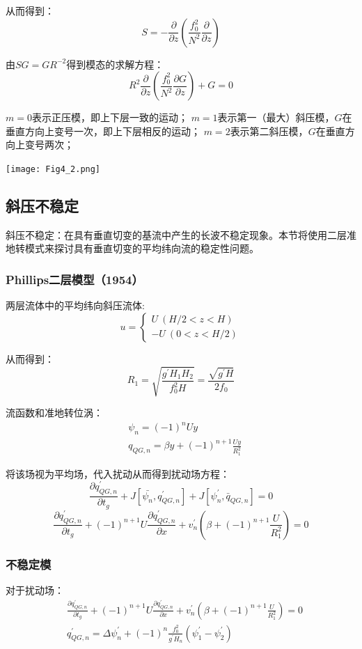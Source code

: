 \documentclass{article}
\begin{document}
从而得到：
$$S = -\frac{\partial}{\partial z}\left(\frac{f_0^2}{N^2}\frac{\partial}{\partial z}\right)$$

由$SG=GR^{-2}$得到模态的求解方程：
$$  R^2\frac{\partial}{\partial z}\left(\frac{f_0^2}{N^2}\frac{\partial G}{\partial z}\right) + G=0$$

$m=0$表示正压模，即上下层一致的运动；
$m=1$表示第一（最大）斜压模，$G$在垂直方向上变号一次，即上下层相反的运动；
$m=2$表示第二斜压模，$G$在垂直方向上变号两次；
\begin{center}
    \texttt{[image: Fig4\_2.png]}
\end{center}


\subsection{斜压不稳定}
斜压不稳定：在具有垂直切变的基流中产生的长波不稳定现象。本节将使用二层准地转模式来探讨具有垂直切变的平均纬向流的稳定性问题。

\subsubsection{Phillips二层模型（1954）}
两层流体中的平均纬向斜压流体:
$$u=\begin{cases}
    U \ (H/2<z<H) \\
    -U \ (0 < z < H/2)
\end{cases}$$

从而得到：
$$R_1 = \sqrt{\frac{g^{\prime}H_1H_2}{f_0^2H}} = \frac{\sqrt{g^{\prime}H}}{2f_0}$$

流函数和准地转位涡：
\begin{align}
&\psi_n = (-1)^nUy\\
&q_{QG,n} = \beta y + (-1)^{n+1}\frac{Uy}{R_1^2}   
\end{align}

将该场视为平均场，代入扰动从而得到扰动场方程：
$$\frac{\partial q^{\prime}_{QG,n}}{\partial t_g} + J[\bar{\psi_n}, q^{\prime}_{QG,n}] + J[\psi^{\prime}_n, \bar{q}_{QG,n}]= 0$$
$$\frac{\partial q^{\prime}_{QG,n}}{\partial t_g} + (-1)^{n+1}U\frac{\partial q^{\prime}_{QG,n}}{\partial x} + v^{\prime}_n\left(\beta + (-1)^{n+1}\frac{U}{R_1^2}\right)= 0$$

\subsubsection{不稳定模}
对于扰动场：
\begin{align}
    &\frac{\partial q^{\prime}_{QG,n}}{\partial t_g} + (-1)^{n+1}U\frac{\partial q^{\prime}_{QG,n}}{\partial x} + v^{\prime}_n\left(\beta + (-1)^{n+1}\frac{U}{R_1^2}\right)= 0\\
    &q^{\prime}_{QG,n} = \Delta \psi^{\prime}_n + (-1)^{n}\frac{f_0^2}{g^{\prime}H_n}(\psi_1^{\prime} - \psi_2^{\prime})
\end{align}
\end{document}
